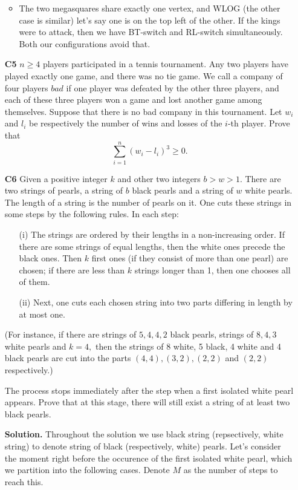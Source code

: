 \documentclass[11pt]{article}
\newcommand{\<}{\langle}
\renewcommand{\>}{\rangle}
\begin{document}
\begin{enumerate}
\begin{itemize}
		\item The two megasquares share exactly one vertex, and WLOG (the other case is similar) let's say one is on the top left of the other. If the kings were to attack, then we have BT-switch and RL-switch simultaneously. Both our configurations avoid that. 
	\end{itemize}

    \item [\textbf{C5}]
    	$n \geq 4$ players participated in a tennis tournament. Any two players have played exactly one game, and there was no tie game. We call a company of four players $bad$ if one player was defeated by the other three players, and each of these three players won a game and lost another game among themselves. Suppose that there is no bad company in this tournament. Let $w_i$ and $l_i$ be respectively the number of wins and losses of the $i$-th player. Prove that\[\sum^n_{i=1} \left(w_i - l_i\right)^3 \geq 0.\]

	\item [\textbf{C6}] 
	Given a positive integer $k$ and other two integers $b > w > 1.$ There are two strings of pearls, a string of $b$ black pearls and a string of $w$ white pearls. The length of a string is the number of pearls on it. One cuts these strings in some steps by the following rules. In each step:
	\begin{enumerate}
		\item [(i)] The strings are ordered by their lengths in a non-increasing order. If there are some strings of equal lengths, then the white ones precede the black ones. Then $k$ first ones (if they consist of more than one pearl) are chosen; if there are less than $k$ strings longer than 1, then one chooses all of them.
		
		\item [(ii)] Next, one cuts each chosen string into two parts differing in length by at most one. 
	\end{enumerate}
	
	(For instance, if there are strings of $5, 4, 4, 2$ black pearls, strings of $8, 4, 3$ white pearls and $k = 4,$ then the strings of 8 white, 5 black, 4 white and 4 black pearls are cut into the parts $(4,4), (3,2), (2,2)$ and $(2,2)$ respectively.) 
	
	The process stops immediately after the step when a first isolated white pearl appears.
	Prove that at this stage, there will still exist a string of at least two black pearls.
	
	\textbf{Solution.} 
	Throughout the solution we use black string (repsectively, white string) to denote string of black (respectively, white) pearls. 
	Let's consider the moment right before the occurence of the first isolated white pearl, which we partition into the following cases. Denote $M$ as the number of steps to reach this. 
	

\end{enumerate}
\end{document}
